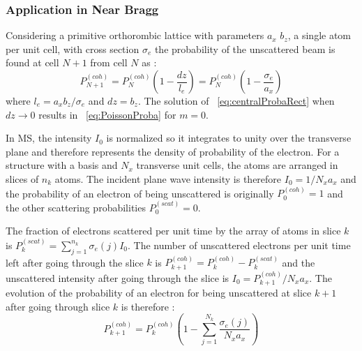 \documentclass[a4paper,10pt]{article}
\begin{document}
\subsubsection{Application in Near Bragg}

Considering a primitive orthorombic lattice with parameters $a_x$ $b_z$, a single atom per unit cell, with cross section $\sigma_e$ the probability of the unscattered beam is found at cell $N+1$ from cell $N$ as :
\begin{equation}\label{eq:centralProbaRect}
  P^{(coh)}_{N+1} =
    P^{(coh)}_{N}\left(1-\frac{dz}{l_e}\right) =
    P^{(coh)}_{N}\left(1-\frac{\sigma_e}{a_x}\right)
\end{equation}
where $l_e=a_xb_z/\sigma_e$ and $dz=b_z$. The solution of ~\eqref{eq:centralProbaRect} when $dz\rightarrow 0$ results in ~\eqref{eq:PoissonProba} for $m=0$.

In MS, the intensity $I_0$ is normalized so it integrates to unity over the transverse plane and therefore represents the density of probability of the electron.
For a structure with a basis and $N_x$ transverse unit cells, the atoms are arranged in slices of $n_k$ atoms.
The incident plane wave intensity is therefore $I_0=1/N_xa_x$ and the probability of an electron of being unscattered is originally $P^{(coh)}_0=1$ and the other scattering probabilities $P^{(scat)}_0=0$.

The fraction of electrons scattered per unit time by the array of atoms in slice $k$ is
$P^{(scat)}_k=\sum_{j=1}^{n_k}\sigma_e(j)I_0$.
The number of unscattered electrons per unit time left after going through the slice $k$ is $P^{(coh)}_{k+1}=P^{(coh)}_k-P^{(scat)}_k$
and the unscattered intensity after going through the slice is
$I_0=P^{(coh)}_{k+1}/N_xa_x$.
The evolution of the probability of an electron for being unscattered at slice $k+1$ after going through slice $k$ is therefore :
\begin{equation}\label{eq:centralProba}
  P^{(coh)}_{k+1} = P^{(coh)}_{k}\left(1-\sum_{j=1}^{N_k}\frac{\sigma_e(j)}{N_xa_x}\right)
\end{equation}
\end{document}
